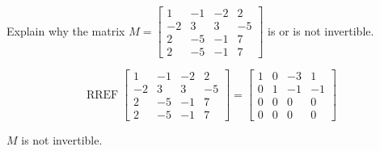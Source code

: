 
\begin{exerciseStatement}


Explain why the matrix \(M= \left[\begin{array}{cccc}
1 & -1 & -2 & 2 \\
-2 & 3 & 3 & -5 \\
2 & -5 & -1 & 7 \\
2 & -5 & -1 & 7
\end{array}\right] \) is or is not invertible.


\end{exerciseStatement}
    
\begin{exerciseAnswer} 


\[\operatorname{RREF} \left[\begin{array}{cccc}
1 & -1 & -2 & 2 \\
-2 & 3 & 3 & -5 \\
2 & -5 & -1 & 7 \\
2 & -5 & -1 & 7
\end{array}\right] = \left[\begin{array}{cccc}
1 & 0 & -3 & 1 \\
0 & 1 & -1 & -1 \\
0 & 0 & 0 & 0 \\
0 & 0 & 0 & 0
\end{array}\right] \]

\(M\) is not invertible.
\end{exerciseAnswer}
    
